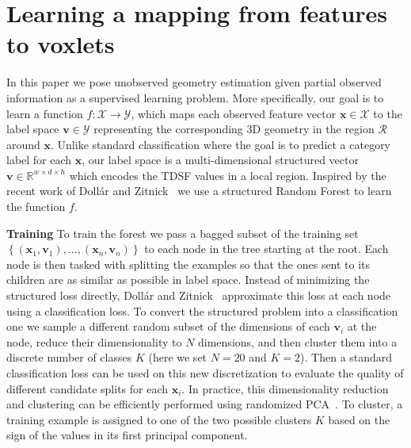 \documentclass[10pt,twocolumn,letterpaper]{article}
\renewcommand{\paragraph}{\vspace{2pt}\noindent\textbf}
\begin{document}
\section{Learning a mapping from features to voxlets}
\label{sec:forest_train}
In this paper we pose unobserved geometry estimation given partial observed information as a supervised learning problem.
More specifically, our goal is to learn a function $f: \mathcal{X}\to \mathcal{Y}$, which maps each observed feature vector $\mathbf{x} \in \mathcal{X}$ to the label space $\mathbf{v} \in \mathcal{Y}$ representing the corresponding 3D geometry in the region $\mathcal{R}$ around $\mathbf{x}$.
Unlike standard classification where the goal is to predict a category label for each $\mathbf{x}$, our label space is a multi-dimensional structured vector $\mathbf{v} \in \mathbb{R}^{w\times{}d\times{}h}$ which encodes the TDSF values in a local region.
Inspired by the recent work of Doll{\'a}r and Zitnick~\cite{dollar-iccv-2013} we use a structured Random Forest to learn the function $f$.

\paragraph{Training}
To train the forest we pass a bagged subset of the training set $\left\{(\mathbf{x}_1, \mathbf{v}_1), ..., (\mathbf{x}_n, \mathbf{v}_n)\right\}$ to each node in the tree starting at the root.
Each node is then tasked with splitting the examples so that the ones sent to its children are as similar as possible in label space.
Instead of minimizing the structured loss directly, Doll{\'a}r and Zitnick~\cite{dollar-iccv-2013} approximate this loss at each node using a classification loss.
To convert the structured problem into a classification one we sample a different random subset of the dimensions of each $\mathbf{v}_i$ at the node, reduce their dimensionality to $N$ dimensions, and then cluster them into a discrete number of classes $K$ (here we set $N=20$ and $K=2$).
Then a standard classification loss can be used on this new discretization to evaluate the quality of different candidate splits for each $\mathbf{x}_i$.
In practice, this dimensionality reduction and clustering can be efficiently performed using randomized PCA~\cite{halko-siam-2011}.
To cluster, a training example is assigned to one of the two possible clusters $K$ based on the sign of the values in its first principal component.
\end{document}
